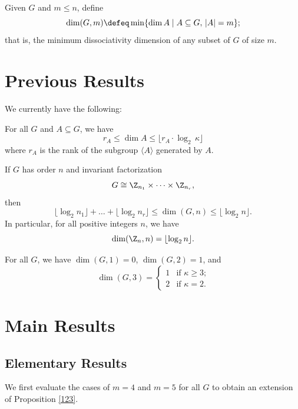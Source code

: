 \documentclass[ml]{ShepardPAPER}
\begin{document}
\begin{definition}
Given $G$ and $m\leq n$, define
    \[\dim(G,m)\defeq\min \{\dim A\mid A \subseteq G,\, |A|=m\};\]
    that is, the minimum dissociativity dimension of any subset of $G$ of size $m$.
\end{definition}

\section{Previous Results}

We currently have the following:

\begin{theorem}\label{F.188}
    For all $G$ and $A\subseteq G$, we have
    \[r_A\leq \dim A\leq \lfloor r_A\cdot\log_2\,\kappa\rfloor\]
    where $r_A$ is the rank of the subgroup $\langle A\rangle$ generated by $A$.
\end{theorem}

\begin{proposition}\label{nr}
    If $G$ has order $n$ and invariant factorization
    \[G\cong\Z_{n_1}\times\cdots\times\Z_{n_r},\]
    then
    \[\lfloor\log_2 n_1\rfloor+\ldots+\lfloor\log_2 n_r\rfloor\leq\dim(G,n)\leq\lfloor\log_2 n\rfloor.\]
    In particular, for all positive integers $n$, we have
    \[\dim(\Z_n,n)=\lfloor\log_2 n\rfloor.\]
\end{proposition}

\begin{proposition}\label{123}
    For all $G$, we have $\dim(G, 1)=0$, $\dim(G, 2)=1$, and
    \[\dim(G, 3) = \begin{cases}1 & \text{if $\kappa\geq3$;} \\ 2 & \text{if $\kappa=2$.}\end{cases}\]
\end{proposition}

\section{Main Results}

\subsection*{Elementary Results}

We first evaluate the cases of $m=4$ and $m=5$ for all $G$ to obtain an extension of Proposition \ref{123}.
\end{document}
